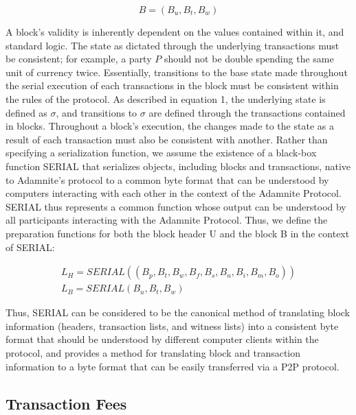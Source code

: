 \documentclass[conference]{IEEEtran}
\begin{document}
\begin{equation}
{B} = (B_{u}, B_{t}, B_{w})
\end{equation}

A block's validity is inherently dependent on the values contained within it, and standard logic. The state as dictated through the underlying transactions must be consistent; for example, a party $P$ should not be double spending the same unit of currency twice. Essentially, transitions to the base state made throughout the serial execution of each transactions in the block must be consistent within the rules of the protocol. As described in equation 1, the underlying state is defined as $\sigma$, and transitions to $\sigma$ are defined through the transactions contained in blocks. Throughout a block's execution, the changes made to the state as a result of each transaction must also be consistent with another.
Rather than specifying a serialization function, we assume the existence of a black-box function SERIAL that serializes objects, including blocks and transactions, native to Adamnite's protocol to a common byte format that can be understood by computers interacting with each other in the context of the Adamnite Protocol. SERIAL thus represents a common function whose output can be understood by all participants interacting with the Adamnite Protocol. Thus, we define the preparation functions for both the block header U and the block B in the context of SERIAL:

\begin{eqnarray}
{L_{H} = SERIAL((B_p,B_t,B_w,B_f,B_s,B_n,B_i,B_m,B_o))}\\
{L_{B}} = SERIAL(B_{u},B_{t},B_{w})
\end{eqnarray}


Thus, SERIAL can be considered to be the canonical method of translating block information (headers, transaction lists, and witness lists) into a consistent byte format that should be understood by different computer clients within the protocol, and provides a method for translating block and transaction information to a byte format that can be easily transferred via a P2P protocol.


\subsection{Transaction Fees}
\end{document}
